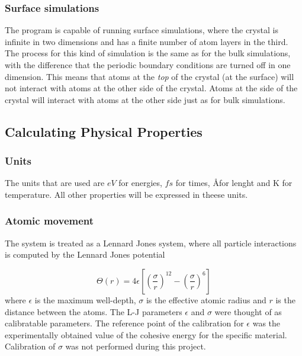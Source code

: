 \documentclass[12pt,a4paper]{article}
\begin{document}
\subsubsection{Surface simulations}
\label{sec:surface_simulations}
The program is capable of running surface simulations, where the crystal is infinite in two dimensions and has a finite number of atom layers in the third. The process for this kind of simulation is the same as for the bulk simulations, with the difference that the periodic boundary conditions are turned off in one dimension. This means that atoms at the \emph{top} of the crystal (at the surface) will not interact with atoms at the other side of the crystal. Atoms at the side of the crystal will interact with atoms at the other side just as for bulk simulations. 


\subsection{Calculating Physical Properties}
\label{sec:calculating_physical_properties}

\subsubsection{Units}
The units that are used are \(eV\) for energies, \(fs\) for times,  \AA \space for lenght and K for temperature. All other properties will be expressed in theese units. 


\subsubsection{Atomic movement}
The system is treated as a Lennard Jones system, where all particle interactions is computed by the Lennard Jones potential 

\begin{equation}
\label{eq:LJ}
\Theta(r)=4 \epsilon \left[\left(\frac{\sigma}{r}\right)^{12} - \left(\frac{\sigma}{r}\right)^6\right]
\end{equation}
where \( \epsilon\) is the maximum well-depth, \( \sigma \) is the effective atomic radius and \( r\) is the distance between the atoms. The L-J parameters \(\epsilon\) and \(\sigma\) were thought of as calibratable parameters. The reference point of the calibration for \(\epsilon\) was the experimentally obtained value of the cohesive energy for the specific material. Calibration of \(\sigma\) was not performed during this project.
\end{document}

